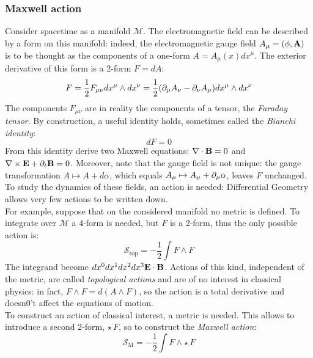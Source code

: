\subsubsection{Maxwell action}

Consider spacetime as a manifold $ \mathcal{M} $. The electromagnetic field can be described by a form on this manifold: indeed, the electromagnetic gauge field $ A_\mu = (\phi,\mathbf{A}) $ is to be thought as the components of a one-form $ A = A_\mu(x) dx^\mu $. The exterior derivative of this form is a 2-form $ F = dA $:
\begin{equation*}
  F = \frac{1}{2} F_{\mu \nu} dx^\mu \wedge dx^\nu = \frac{1}{2} (\partial_\mu A_\nu - \partial_\nu A_\mu) dx^\mu \wedge dx^\nu
\end{equation*}
The components $ F_{\mu \nu} $ are in reality the components of a tensor, the \textit{Faraday tensor}. By construction, a useful identity holds, sometimes called the \textit{Bianchi identity}:
\begin{equation}
  dF = 0
  \label{eq:3.42}
\end{equation}
From this identity derive two Maxwell equations: $ \nabla\cdot\mathbf{B} = 0 $ and $ \nabla\times\mathbf{E} + \partial_t \mathbf{B} = 0 $. Moreover, note that the gauge field is not unique: the gauge transformation $ A \mapsto A + d\alpha $, which equals $ A_\mu \mapsto A_\mu + \partial_\mu \alpha $, leaves $ F $ unchanged.\\
To study the dynamics of these fields, an action is needed: Differential Geometry allows very few actions to be written down.\\
For example, suppose that on the considered manifold no metric is defined. To integrate over $ \mathcal{M} $ a 4-form is needed, but $ F $ is a 2-form, thus the only possible action is:
\begin{equation}
  \mathcal{S}_{\text{top}} = - \frac{1}{2} \int F \wedge F
  \label{eq:3.43}
\end{equation}
The integrand become $ dx^0 dx^1 dx^2 dx^3 \mathbf{E}\cdot\mathbf{B} $. Actions of this kind, independent of the metric, are called \textit{topological actions} and are of no interest in classical physics: in fact, $ F \wedge F = d (A \wedge F) $, so the action is a total derivative and doesn0't affect the equations of motion.\\
To construct an action of classical interest, a metric is needed. This allows to introduce a second 2-form, $ \star\, F $, so to construct the \textit{Maxwell action}:
\begin{equation}
  \mathcal{S}_{\text{M}} = - \frac{1}{2} \int F \wedge \star\, F
  \label{eq:3.44}
\end{equation}
